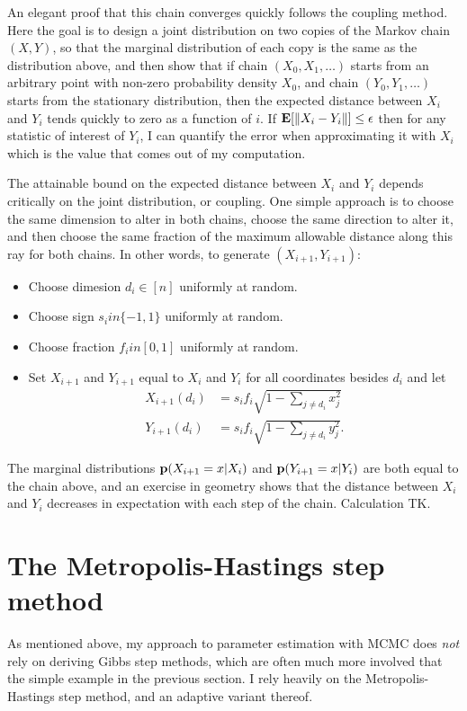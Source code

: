 An elegant proof that this chain converges quickly follows the
coupling method.\cite{Torgey Lindval The Coupling Method} Here the goal is
to design a joint distribution on two copies of the Markov chain $(X,
Y)$, so that the marginal distribution of each copy is the same as the
distribution above, and then show that if chain $(X_0, X_1, \ldots)$
starts from an arbitrary point with non-zero probability density
$X_0$, and chain $(Y_0, Y_1, \ldots)$ starts from the stationary
distribution, then the expected distance between $X_i$ and $Y_i$ tends
quickly to zero as a function of $i$.  If $\mathbf{E}[\|X_i - Y_i\|] \leq \epsilon$
then for any statistic of interest of $Y_i$, I can quantify the error
when approximating it with $X_i$ which is the value that comes out of
my computation.

The attainable bound on the expected distance between $X_i$ and $Y_i$
depends critically on the joint distribution, or coupling.  One simple
approach is to choose the same dimension to alter in both chains,
choose the same direction to alter it, and then choose the same
fraction of the maximum allowable distance along this ray for both
chains.  In other words, to generate $(X_{i+1}, Y_{i+1})$:
\begin{itemize}
\item Choose dimesion $d_i \in [n]$ uniformly at random.
\item Choose sign $s_i in \{-1, 1\}$ uniformly at random.
\item Choose fraction $f_i in [0,1]$ uniformly at random.
\item Set $X_{i+1}$ and $Y_{i+1}$ equal to $X_i$ and $Y_i$ for all coordinates besides $d_i$ and let
\begin{align*}
X_{i+1}(d_i) &= s_i f_i \sqrt{1 - \sum_{j\neq d_i} x_j^2}\\
Y_{i+1}(d_i) &= s_i f_i \sqrt{1 - \sum_{j\neq d_i} y_j^2}.
\end{align*}
\end{itemize}

The marginal distributions $\mathbf{p}(X_{i+1}=x|X_i)$ and
$\mathbf{p}(Y_{i+1}=x|Y_i)$ are both equal to the chain above, and an
exercise in geometry shows that the distance between $X_i$ and $Y_i$
decreases in expectation with each step of the chain. Calculation TK.

\section{The Metropolis-Hastings step method}
As mentioned above, my approach to parameter estimation with MCMC does
\emph{not} rely on deriving Gibbs step methods, which are often much
more involved that the simple example in the previous section.  I rely
heavily on the Metropolis-Hastings step method, and an adaptive
variant thereof.

